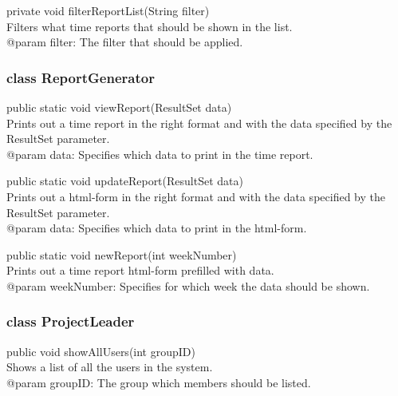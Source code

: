 \documentclass[a4paper]{article}
\begin{document}
\vspace{5mm}
\begin{hangparas}{1.5em}{1}
private void filterReportList(String filter)\\
Filters what time reports that should be shown in the list.\\
@param filter: The filter that should be applied.\\
\end{hangparas}


\subsubsection{class ReportGenerator}

\begin{hangparas}{1.5em}{1}
public static void viewReport(ResultSet data)\\
Prints out a time report in the right format and with the data specified by the ResultSet parameter.\\
@param data: Specifies which data to print in the time report. 
\end{hangparas}

\vspace{5mm}
\begin{hangparas}{1.5em}{1}
public static void updateReport(ResultSet data)\\
Prints out a html-form in the right format and with the data specified by the ResultSet parameter.\\ 
@param data: Specifies which data to print in the html-form.
\end{hangparas}

\vspace{5mm}
\begin{hangparas}{1.5em}{1}
public static void newReport(int weekNumber)\\
Prints out a time report html-form prefilled with data.\\
@param weekNumber: Specifies for which week the data should be shown.\\
\end{hangparas}
 

\subsubsection{class ProjectLeader}

\begin{hangparas}{1.5em}{1}
public void showAllUsers(int groupID)\\
Shows a list of all the users in the system.\\
@param groupID: The group which members should be listed.
\end{hangparas}
\end{document}
